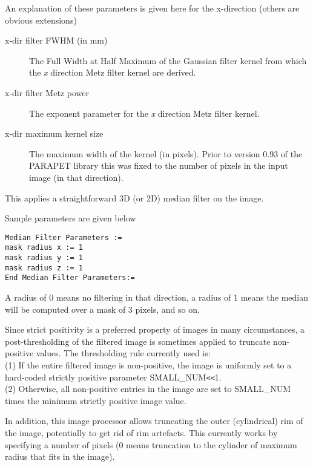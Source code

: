 \documentclass{article}
\newcommand{\tab}{\hspace{5mm}}
\begin{document}
An explanation of these parameters is given here for the x-direction 
(others are obvious extensions)
\begin{description}
\item[x-dir filter FWHM (in mm)]
The Full Width at Half Maximum of the Gaussian filter kernel 
from which the \textit{x} direction Metz filter kernel are derived.

\item[x-dir filter Metz power]
The exponent parameter for the \textit{x} direction Metz filter kernel.

\item[x-dir maximum kernel size]
The maximum width of the kernel (in pixels). Prior to version 
0.93 of the PARAPET library this was fixed to the number of pixels 
in the input image (in that direction).
\end{description}

{ 
}
\label{sec:median}
This applies a straightforward 3D (or 2D) median filter on the 
image.

{ 
}

Sample parameters are given below

\begin{verbatim}
Median Filter Parameters := 
mask radius x := 1  
mask radius y := 1 
mask radius z := 1 
End Median Filter Parameters:=
\end{verbatim}


A radius of 0 means no filtering in that direction, a radius 
of 1 means the median will be computed over a mask of 3 pixels, 
and so on.

{ 
}

Since strict positivity is a preferred property of images in 
many circumstances, a post-thresholding of the filtered image 
is sometimes applied to truncate non-positive values. The thresholding 
rule currently used is:\\
(1)\tab 
If the entire filtered image is non-positive, the image is uniformly 
set to a hard-coded strictly positive parameter SMALL\_NUM\texttt{<}\texttt{<}1.\\
(2)\tab 
Otherwise, all non-positive entries in the image are set to SMALL\_NUM 
times the minimum strictly positive image value.


In addition, this image processor allows truncating the outer 
(cylindrical) rim of the image, potentially to get rid of rim 
artefacts. This currently works by specifying a number of pixels 
(0 means truncation to the cylinder of maximum radius that fits 
in the image). 
\end{document}
